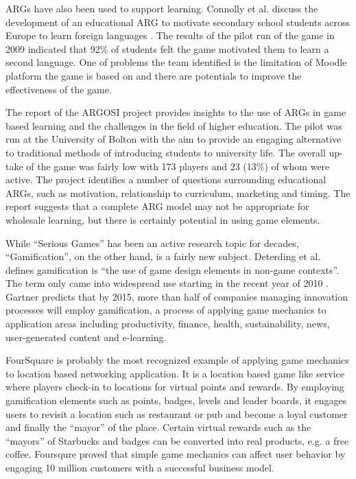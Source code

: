 ARGs have also been used to support learning. Connolly et al. \cite{connolly2009arguing} discuss the development of an educational ARG to motivate secondary school students across Europe to learn foreign languages . The results of the pilot run of the game in 2009 indicated that 92\% of students felt the game motivated them to learn a second language. One of problems the team identified is the limitation of Moodle platform the game is based on and there are potentials to improve the effectiveness of the game.

The report of the ARGOSI project \cite{whitton2009alternate} provides insights to the use of ARGs in game based learning and the challenges in the field of higher education. The pilot was run at the University of Bolton with the aim to provide an engaging alternative to traditional methods of introducing students to university life. The overall up-take of the game was fairly low with 173 players and 23 (13\%) of whom were active. The project identifies a number of questions surrounding educational ARGs, such as motivation, relationship to curriculum, marketing and timing. The report
suggests that a complete ARG model may not be appropriate for wholesale learning, but there is certainly potential in using game elements.

While ``Serious Games'' has been an active research topic for decades, ``Gamification'', on the other hand, is a fairly new subject. Deterding et al. \cite {Deterding2011mt} defines gamification is ``the use of game design elements in non-game contexts''. The term only came into widespread use starting in the recent year of 2010 \cite {schell2010design}. Gartner \cite {gartnerPress2011} predicts that by 2015, more than half of companies managing innovation processes will employ gamification, a process of applying game mechanics to application areas including productivity, finance, health, sustainability, news, user-generated content and e-learning. 

FourSquare \cite{foursquare} is probably the most recognized example of applying game mechanics to location based networking application. It is a location based game like service where players check-in to locations for virtual points and rewards.  By employing gamification elements such as points, badges, levels and leader boards, it engages users to revisit a location such as restaurant or pub and become a loyal customer and finally the ``mayor'' of the place. Certain virtual rewards such as the ``mayors'' of Starbucks and badges can be converted into real products, e.g. a free coffee. Foursqure proved that simple game mechanics can affect user behavior by engaging 10 million customers with a successful business model.

